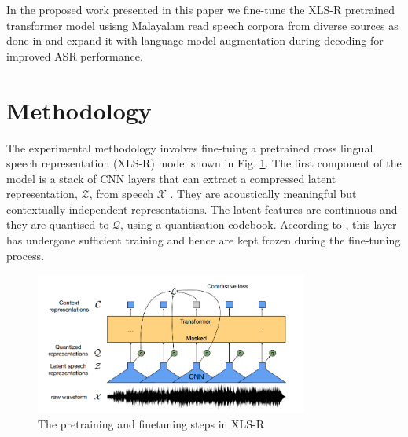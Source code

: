 \documentclass[runningheads]{llncs}
\begin{document}

In the proposed work presented in this paper we fine-tune the XLS-R pretrained transformer model usisng Malayalam read speech corpora from diverse sources as done in \cite{manohar2023automatic} and expand it with language model augmentation during decoding for improved ASR performance. 


\section{Methodology}



The experimental methodology involves fine-tuing a pretrained cross lingual speech representation (XLS-R) model shown in Fig. \ref{finetune}. The first component of the model is a stack of CNN layers that can extract a compressed latent representation, $\mathcal{Z}$, from speech $\mathcal{X}$ \cite{babu2021xls}. They are acoustically meaningful but contextually independent representations. The latent features are continuous and they are quantised to $\mathcal{Q}$, using a quantisation codebook. According to \cite{babu2021xls}, this layer has undergone sufficient training and hence are kept frozen during the fine-tuning process.

\begin{figure}[!h]
    \includegraphics[width=0.8\textwidth]{xlsr.png}
    \centering
    \caption{The pretraining and finetuning steps in XLS-R} 
    \label{finetune}
\end{figure}
\end{document}
